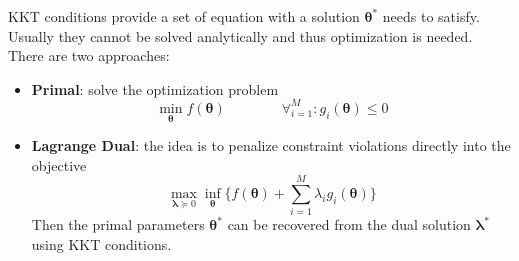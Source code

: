 KKT conditions provide a set of equation with a solution $\mathbf{\theta^*}$ needs to satisfy. Usually they cannot be solved analytically and thus optimization is needed. There are two approaches:
\begin{itemize}
	\item \textbf{Primal}: solve the optimization problem
	\begin{equation}
		\min_\mathbf{\theta} f(\mathbf{\theta}) \qquad\qquad \forall_{i=1}^M: g_i(\mathbf{\theta}) \leq 0
	\end{equation}
	\item \textbf{Lagrange Dual}: the idea is to penalize constraint violations directly into the objective
	\begin{equation}
		\max_{\mathbf{\lambda}\succeq 0} \inf_\mathbf{\theta} \big\{f(\mathbf{\theta}) + \sum_{i=1}^{M} \lambda_i g_i(\mathbf{\theta})\big\}
	\end{equation}
	Then the primal parameters $\mathbf{\theta^*}$ can be recovered from the dual solution $\mathbf{\lambda}^*$ using KKT conditions.
\end{itemize}

